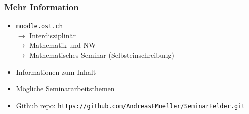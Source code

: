 %
%
%
\bgroup
\begin{frame}[t]
\setlength{\abovedisplayskip}{5pt}
\setlength{\belowdisplayskip}{5pt}
\frametitle{Mehr Information}
\begin{itemize}
\item \texttt{moodle.ost.ch}\\
$\rightarrow$ Interdisziplinär\\
$\rightarrow$ Mathematik und NW\\
$\rightarrow$ Mathematisches Seminar
(Selbsteinschreibung)
\item<2-> Informationen zum Inhalt
\item<3-> Mögliche Seminararbeitsthemen
\item<4-> Github repo: \texttt{https://github.com/AndreasFMueller/SeminarFelder.git}
\end{itemize}
\end{frame}
\egroup
